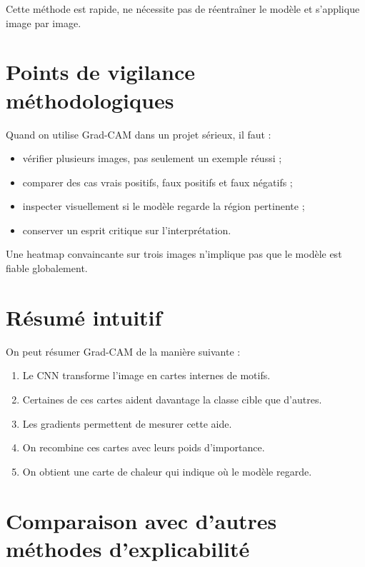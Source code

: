 ﻿\documentclass[11pt,a4paper]{article}
\begin{document}
Cette méthode est rapide, ne nécessite pas de réentraîner le modèle et s'applique image par image.

\section{Points de vigilance méthodologiques}

Quand on utilise Grad-CAM dans un projet sérieux, il faut :
\begin{itemize}
    \item vérifier plusieurs images, pas seulement un exemple réussi ;
    \item comparer des cas vrais positifs, faux positifs et faux négatifs ;
    \item inspecter visuellement si le modèle regarde la région pertinente ;
    \item conserver un esprit critique sur l'interprétation.
\end{itemize}

Une heatmap convaincante sur trois images n'implique pas que le modèle est fiable globalement.

\section{Résumé intuitif}

On peut résumer Grad-CAM de la manière suivante :

\begin{enumerate}[label=\arabic*)]
    \item Le CNN transforme l'image en cartes internes de motifs.
    \item Certaines de ces cartes aident davantage la classe cible que d'autres.
    \item Les gradients permettent de mesurer cette aide.
    \item On recombine ces cartes avec leurs poids d'importance.
    \item On obtient une carte de chaleur qui indique où le modèle regarde.
\end{enumerate}

\begin{center}
\end{center}

\section{Comparaison avec d'autres méthodes d'explicabilité}
\end{document}
